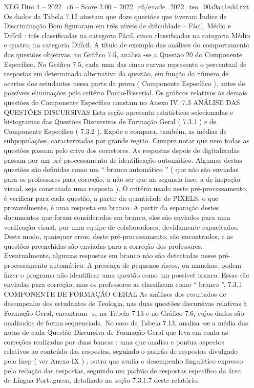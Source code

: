 \begin{textsample}{NEG Dim 4 – 2022\_c6 – Score 2.00 – 2022\_c6/enade\_2022\_teo\_00a9aa1edd.txt}
Os dados da Tabela 7.12 atestam que doze questões que tiveram Índice de Discriminação Bom figuraram em três níveis de dificuldade – Fácil, Médio e Difícil : três classificadas na categoria Fácil, cinco classificadas na categoria Médio e quatro, na categoria Difícil.
A título de exemplo das análises do comportamento das questões objetivas, no Gráfico 7.5, analisa -se a Questão 20 do Componente Específico.
No Gráfico 7.5, cada uma das cinco curvas representa o percentual de respostas em determinada alternativa da questão, em função do número de acertos dos estudantes nessa parte da prova ( Componente Específico ), antes de possíveis eliminações pelo critério Ponto-Bisserial.
Os gráficos relativos às demais questões do Componente Específico constam no Anexo IV. 7.3 ANÁLISE DAS QUESTÕES DISCURSIVAS Esta seção apresenta estatísticas selecionadas e histogramas das Questões Discursivas de Formação Geral ( 7.3.1 ) e de Componente Específico ( 7.3.2 ).
Expõe e compara, também, as médias de subpopulações, caracterizadas por grande região.
Cumpre notar que nem todas as questões passam pelo crivo dos corretores.
As respostas depois de digitalizadas passam por um pré-processamento de identificação automático.
Algumas destas questões são definidas como um “ branco automático ” ( que não são enviadas para os professores para correção, a não ser que na segunda fase, a de inspeção visual, seja constatada uma resposta ).
O critério usado neste pré-processamento, é verificar para cada questão, a partir da quantidade de PIXELS, o que provavelmente, é uma resposta em branco.
A partir da separação destes documentos que foram considerados em branco, eles são enviados para uma verificação visual, por uma equipe de colaboradores, devidamente capacitados.
Deste modo, quaisquer erros, deste pré-processamento, são encontrados, e as questões preenchidas são enviadas para a correção dos professores.
Eventualmente, algumas respostas em branco não são detectadas nesse pré-processamento automático.
A presença de pequenos riscos, ou manchas, podem fazer o programa não identificar uma questão como um possível branco.
Essas são enviadas para correção, mas os professores as classificam como “ branco ”. 7.3.1 COMPONENTE DE FORMAÇÃO GERAL As análises dos resultados de desempenho dos estudantes de Teologia, nas duas questões discursivas relativas à Formação Geral, encontram -se na Tabela 7.13 e no Gráfico 7.6, cujos dados são analisados de forma sequenciada.
No caso da Tabela 7.13, analisa -se a média das notas de cada Questão Discursiva de Formação Geral que leva em conta as correções realizadas por duas bancas : uma que analisa e pontua aspectos relativos ao conteúdo das respostas, seguindo o padrão de respostas divulgado pelo Inep ( ver Anexo IX ) ; outra que avalia o desempenho linguístico expresso pela redação das respostas, seguindo um padrão de respostas específico da área de Língua Portuguesa, detalhado na seção 7.3.1.7 deste relatório.

\end{textsample}
